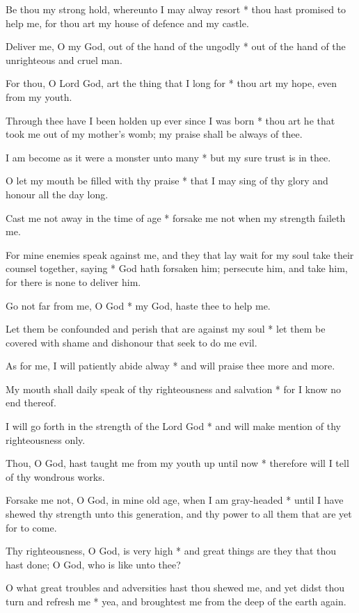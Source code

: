 Be thou my strong hold, whereunto I may alway resort * thou hast promised to help me, for thou art my house of defence and my castle.

Deliver me, O my God, out of the hand of the ungodly * out of the hand of the unrighteous and cruel man.

For thou, O Lord God, art the thing that I long for * thou art my hope, even from my youth.

Through thee have I been holden up ever since I was born * thou art he that took me out of my mother's womb; my praise shall be always of thee.

I am become as it were a monster unto many * but my sure trust is in thee.

O let my mouth be filled with thy praise * that I may sing of thy glory and honour all the day long.

Cast me not away in the time of age * forsake me not when my strength faileth me.

For mine enemies speak against me, and they that lay wait for my soul take their counsel together, saying * God hath forsaken him; persecute him, and take him, for there is none to deliver him.

Go not far from me, O God * my God, haste thee to help me.

Let them be confounded and perish that are against my soul * let them be covered with shame and dishonour that seek to do me evil.

As for me, I will patiently abide alway * and will praise thee more and more.

My mouth shall daily speak of thy righteousness and salvation * for I know no end thereof.

I will go forth in the strength of the Lord God * and will make mention of thy righteousness only.

Thou, O God, hast taught me from my youth up until now * therefore will I tell of thy wondrous works.

Forsake me not, O God, in mine old age, when I am gray-headed * until I have shewed thy strength unto this generation, and thy power to all them that are yet for to come.

Thy righteousness, O God, is very high * and great things are they that thou hast done; O God, who is like unto thee?

O what great troubles and adversities hast thou shewed me, and yet didst thou turn and refresh me * yea, and broughtest me from the deep of the earth again.

